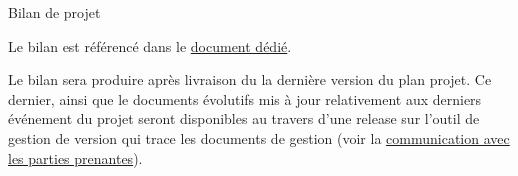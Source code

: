 \documentclass[]{article}
\begin{document}
{    \begin{section}{\label{sec:Bilan de projet}Bilan de projet}
     \begin{subsection}{\label{sec:Référencement du bilan}}
         Le bilan est référencé dans le \href{documents/Bilan_de_projet.pdf}{document dédié}.
     \end{subsection}

     \begin{subsection}{\label{sec:Production du bilan}}
         Le bilan sera produire après livraison du la dernière version du plan projet.
         Ce dernier, ainsi que le documents évolutifs mis à jour relativement aux derniers événement du projet seront disponibles au travers d’une release sur l’outil de gestion de version qui trace les documents de gestion (voir la \hyperref[sec:Communication avec les parties prenantes]{communication avec les parties prenantes}).
     \end{subsection}
    \end{section}
}
\end{document}
